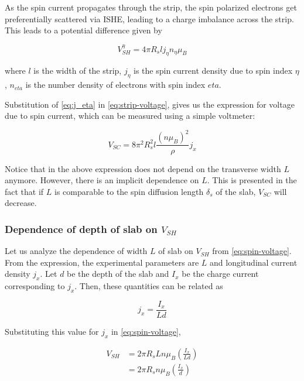 As the spin current propagates through the strip, the spin polarized electrons get preferentially scattered via ISHE, leading to a charge imbalance across the strip.
This leads to a potential difference given by

\begin{equation} \label{eq:strip-voltage}
    V_{SH}^{\eta} = 4 \pi R_s l j_{\eta} n_{\eta} \mu_B
\end{equation}

where \( l \) is the width of the strip, \( j_{\eta} \) is the spin current density due to spin index \( \eta \), \( n_{eta} \) is the number density of electrons with spin index \( eta \).

Substitution of \cref{eq:j_eta} in \cref{eq:strip-voltage}, gives us the expression for voltage due to spin current, which can be measured using a simple voltmeter:

\begin{equation} \label{eq:spin-voltage2}
    V_{SC} = 8 \pi^2 R_s^2 l \frac{(n \mu_B)^2}{\rho} j_x
\end{equation}

Notice that in the above expression does not depend on the transverse width \( L \) anymore.
However, there is an implicit dependence on \( L \).
This is presented in the fact that if \( L \) is comparable to the spin diffusion length \( \delta_s \) of the slab, \( V_{SC} \) will decrease.

\subsubsection{Dependence of depth of slab on \( V_{SH} \) }

Let us analyze the dependence of width \( L \) of slab on \( V_{SH} \) from \cref{eq:spin-voltage}.
From the expression, the experimental parameters are \( L \) and longitudinal current density \( j_x \).
Let \( d \) be the depth of the slab and \( I_x \) be the charge current corresponding to \( j_x \).
Then, these quantities can be related as

\begin{equation*}
    j_x = \frac{I_x}{L d}
\end{equation*}

Substituting this value for \( j_x \) in \cref{eq:spin-voltage},

\begin{equation} \label{eq:spin-substitution}
    \begin{split}
        V_{SH} &= 2 \pi R_s L n \mu_B \left( \frac{I_x}{L d} \right)\\
               &= 2 \pi R_s n \mu_B \left( \frac{I_x}{d} \right)
    \end{split}
\end{equation}

